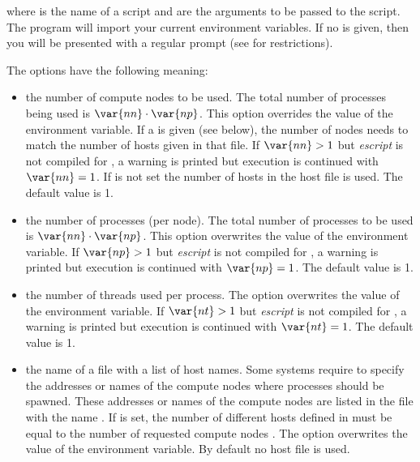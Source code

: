 where  is the name of a script and  are the arguments to
be passed to the script.
The  program will import your current environment variables. 
If no  is given, then you will be presented with a regular \PYTHON
prompt (see  for restrictions).

The options have the following meaning:
\begin{itemize}
\item[\programopt{-n} \var{nn}] the number of compute nodes  to be used.
    The total number of processes being used is $\var{nn} \cdot \var{np}$.
    This option overrides the value of the 
    environment variable. 
    If a  is given (see below), the number of nodes needs to
    match the number of hosts given in that file.
    If $\var{nn}>1$ but {\it escript} is not compiled for \MPI, a warning is
    printed but execution is continued with $\var{nn}=1$.
    If  is not set the number of hosts in the host file is
    used. The default value is 1.
 
\item[\programopt{-p} \var{np}] the number of \MPI processes (per node).
    The total number of processes to be used is $\var{nn} \cdot \var{np}$.
    This option overwrites the value of the 
    environment variable.
    If $\var{np}>1$ but {\it escript} is not compiled for \MPI, a warning is
    printed but execution is continued with $\var{np}=1$.
    The default value is 1.

\item[\programopt{-t} \var{nt}] the number of threads used per process.
    The option overwrites the value of the 
    environment variable.
    If $\var{nt}>1$ but {\it escript} is not compiled for \OPENMP, a warning
    is printed but execution is continued with $\var{nt}=1$.
    The default value is 1.

\item[\programopt{-f} \var{hostfile}] the name of a file with a list of host names.
    Some systems require to specify the addresses or names of the compute
    nodes where \MPI processes should be spawned.
    These addresses or names of the compute nodes are listed in the file with
    the name .
    If  is set, the number of different hosts defined in 
    must be equal to the number of requested compute nodes .
    The option overwrites the value of the  environment
    variable. By default no host file is used.


\end{itemize}
